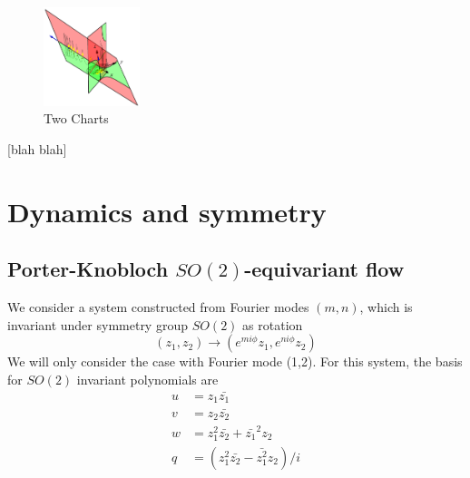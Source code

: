 \documentclass{article}
\begin{document}
\begin{figure}
\centering
\includegraphics[width=0.25\textwidth]{RoessSctAtlas3.png}
\caption{Two Charts}
\label{fig:RoessSctAtlas3}
\end{figure}

 [blah blah]

\section{Dynamics and symmetry}
\label{s:symm}

\subsection{Porter-Knobloch $SO(2)$-equivariant flow}
\label{s:twoMode}

We consider a system constructed from Fourier modes $(m,n)$\cite{Dang86,AGHO288,PoKno05}, which is invariant under symmetry group $SO(2)$ as rotation
\begin{equation}
(z_1,z_2)\to(e^{mi\phi}z_1,e^{ni\phi}z_2)\label{Dang86(1.1)aa}
\end{equation}
We will only consider the case with Fourier mode (1,2). For this system, the basis for $SO(2)$ invariant polynomials are
\begin{align}
u&=z_1\bar{z_1}\\
v&=z_2\bar{z_2}\\
w&=z_1^2\bar{z_2}+\bar{z_1}^2z_2\\
q&=(z_1^2\bar{z_2}-\bar{z_1^2}z_2)/i\\
\label{Dang86(1.2)PK}
\end{align}
\end{document}
